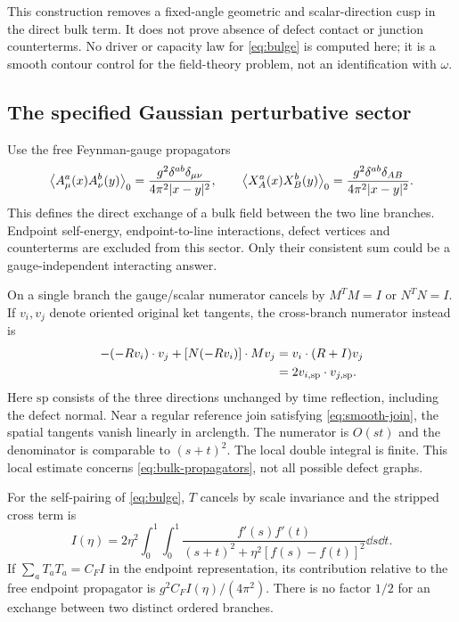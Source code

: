 This construction removes a fixed-angle geometric and scalar-direction
cusp in the direct bulk term. It does not prove absence of defect
contact or junction counterterms. No driver or capacity law for
\eqref{eq:bulge} is computed here; it is a smooth contour control for
the field-theory problem, not an identification with $\omega$.

\subsection{The specified Gaussian perturbative sector}

Use the free Feynman-gauge propagators
\begin{equation}\label{eq:bulk-propagators}
 \left\langle A_\mu^a(x)A_\nu^b(y)\right\rangle_0
 =\frac{g^2\delta^{ab}\delta_{\mu\nu}}{4\pi^2|x-y|^2},\qquad
 \left\langle X_A^a(x)X_B^b(y)\right\rangle_0
 =\frac{g^2\delta^{ab}\delta_{AB}}{4\pi^2|x-y|^2}.
\end{equation}
This defines the direct exchange of a bulk field between the two line
branches. Endpoint self-energy, endpoint-to-line interactions, defect
vertices and counterterms are excluded from this sector. Only their
consistent sum could be a gauge-independent interacting answer.

On a single branch the gauge/scalar numerator cancels by $M^TM=I$
or $N^TN=I$. If $v_i,v_j$ denote oriented original ket tangents,
the cross-branch numerator instead is
\begin{align}\label{eq:cross-numerator}
 -(-Rv_i)\cdot v_j+[N(-Rv_i)]\cdot Mv_j
 &=v_i\cdot(R+I)v_j\notag\\
 &=2v_{i,\mathrm{sp}}\cdot v_{j,\mathrm{sp}}.
\end{align}
Here $\mathrm{sp}$ consists of the three directions unchanged by time
reflection, including the defect normal. Near a regular reference
join satisfying \eqref{eq:smooth-join}, the spatial tangents vanish
linearly in arclength. The numerator is $O(st)$ and the denominator
is comparable to $(s+t)^2$. The local double integral is finite.
This local estimate concerns \eqref{eq:bulk-propagators}, not all
possible defect graphs.

For the self-pairing of \eqref{eq:bulge}, $T$ cancels by scale
invariance and the stripped cross term is
\begin{equation}\label{eq:bulk-I}
 I(\eta)=2\eta^2\int_0^1\!\int_0^1
 \frac{f'(s)f'(t)}{(s+t)^2+\eta^2[f(s)-f(t)]^2}\dd s\dd t.
\end{equation}
If $\sum_aT_aT_a=C_F I$ in the endpoint representation, its contribution
relative to the free endpoint propagator is
$g^2C_F I(\eta)/(4\pi^2)$. There is no factor $1/2$ for an exchange
between two distinct ordered branches.

